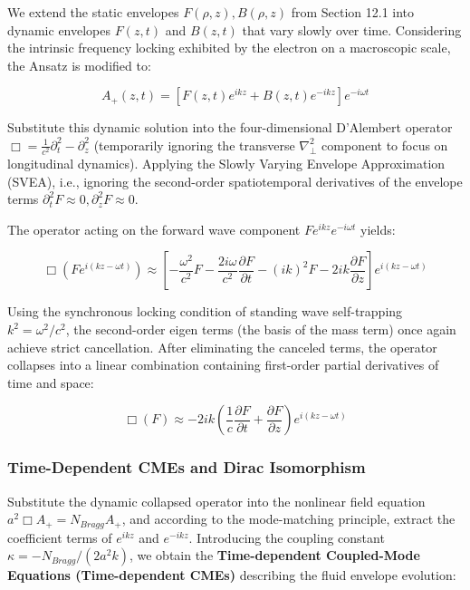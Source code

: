 \documentclass[12pt, a4paper]{article}
\begin{document}
We extend the static envelopes $F(\rho, z), B(\rho, z)$ from Section 12.1 into dynamic envelopes $F(z, t)$ and $B(z, t)$ that vary slowly over time. Considering the intrinsic frequency locking exhibited by the electron on a macroscopic scale, the Ansatz is modified to:

\begin{equation}
A_+(z, t) = \left[ F(z, t) e^{ikz} + B(z, t) e^{-ikz} \right] e^{-i\omega t} 
\end{equation}

Substitute this dynamic solution into the four-dimensional D'Alembert operator $\Box = \frac{1}{c^2}\partial_t^2 - \partial_z^2$ (temporarily ignoring the transverse $\nabla_\perp^2$ component to focus on longitudinal dynamics). Applying the Slowly Varying Envelope Approximation (SVEA), i.e., ignoring the second-order spatiotemporal derivatives of the envelope terms $\partial_t^2 F \approx 0, \partial_z^2 F \approx 0$.

The operator acting on the forward wave component $F e^{ikz} e^{-i\omega t}$ yields:

\begin{equation}
\Box \left( F e^{i(kz-\omega t)} \right) \approx \left[ -\frac{\omega^2}{c^2} F - \frac{2i\omega}{c^2} \frac{\partial F}{\partial t} - (ik)^2 F - 2ik \frac{\partial F}{\partial z} \right] e^{i(kz-\omega t)} 
\end{equation}

Using the synchronous locking condition of standing wave self-trapping $k^2 = \omega^2/c^2$, the second-order eigen terms (the basis of the mass term) once again achieve strict cancellation. After eliminating the canceled terms, the operator collapses into a linear combination containing first-order partial derivatives of time and space:

\begin{equation}
\Box \left( F \right) \approx -2ik \left( \frac{1}{c} \frac{\partial F}{\partial t} + \frac{\partial F}{\partial z} \right) e^{i(kz-\omega t)} 
\end{equation}

\subsubsection{Time-Dependent CMEs and Dirac Isomorphism}

Substitute the dynamic collapsed operator into the nonlinear field equation $a^2\Box A_+ = N_{Bragg} A_+$, and according to the mode-matching principle, extract the coefficient terms of $e^{ikz}$ and $e^{-ikz}$. Introducing the coupling constant $\kappa = -N_{Bragg}/(2a^2 k)$, we obtain the \textbf{Time-dependent Coupled-Mode Equations (Time-dependent CMEs)} describing the fluid envelope evolution:
\end{document}
